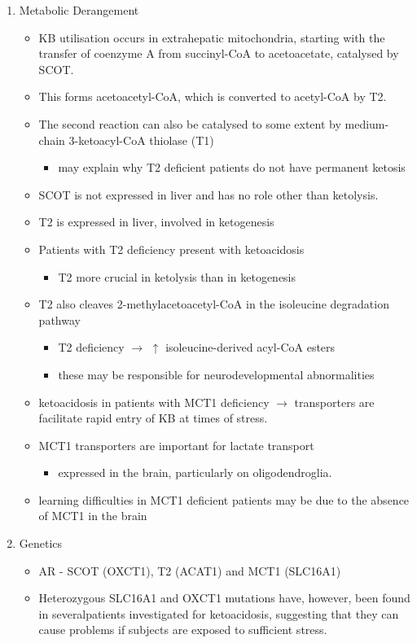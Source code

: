 \documentclass{scrartcl}
\begin{document}
\begin{enumerate}
\item Metabolic Derangement
\label{sec:org248c90a}
\begin{itemize}
\item KB utilisation occurs in extrahepatic mitochondria, starting with
the transfer of coenzyme A from succinyl-CoA to acetoacetate,
catalysed by SCOT.
\item This forms acetoacetyl-CoA, which is converted to acetyl-CoA by T2.
\item The second reaction can also be catalysed to some extent by
medium-chain 3-ketoacyl-CoA thiolase (T1)
\begin{itemize}
\item may explain why T2 deficient patients do not have permanent
ketosis
\end{itemize}
\item SCOT is not expressed in liver and has no role other than
ketolysis.
\item T2 is expressed in liver, involved in ketogenesis
\item Patients with T2 deficiency present with ketoacidosis
\begin{itemize}
\item T2 more crucial in ketolysis than in ketogenesis
\end{itemize}
\item T2 also cleaves 2-methylacetoacetyl-CoA in the isoleucine
degradation pathway
\begin{itemize}
\item T2 deficiency \(\to\) \(\uparrow\) isoleucine-derived acyl-CoA esters
\item these may be responsible for neurodevelopmental abnormalities
\end{itemize}
\item ketoacidosis in patients with MCT1 deficiency \(\to\) transporters are
facilitate rapid entry of KB at times of stress.
\item MCT1 transporters are important for lactate transport
\begin{itemize}
\item expressed in the brain, particularly on oligodendroglia.
\end{itemize}
\item learning difficulties in MCT1 deficient patients may be due to the
absence of MCT1 in the brain
\end{itemize}

\item Genetics
\label{sec:org745b29b}
\begin{itemize}
\item AR - SCOT (OXCT1), T2 (ACAT1) and MCT1 (SLC16A1)
\item Heterozygous SLC16A1 and OXCT1 mutations have, however, been found
in severalpatients investigated for ketoacidosis, suggesting that
they can cause problems if subjects are exposed to sufficient stress.


\end{itemize}
\end{enumerate}
\end{document}
